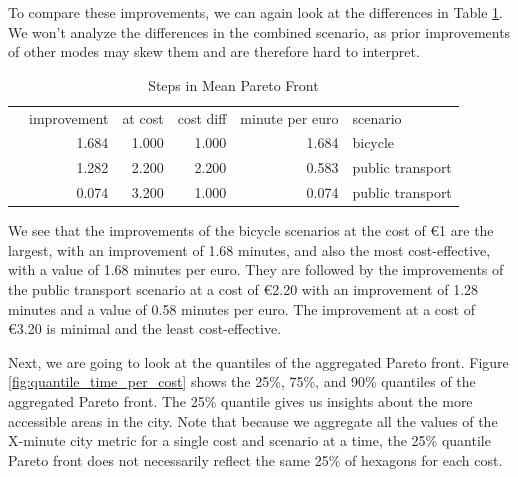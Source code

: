 To compare these improvements, we can again look at the differences in Table \ref{tab:differences_in_mean_pareto_front}.
We won't analyze the differences in the combined scenario, as prior improvements of other modes may skew them and are therefore hard to interpret.

\begin{table}
  \caption{Steps in Mean Pareto Front}
  \label{tab:differences_in_mean_pareto_front}
  \begin{center}
    \begin{tabular}{lrrrrl}
     & improvement & at cost & cost diff & minute per euro & scenario \\
     & 1.684 & 1.000 & 1.000 & 1.684 & bicycle \\
     & 1.282 & 2.200 & 2.200 & 0.583 & public transport \\
     & 0.074 & 3.200 & 1.000 & 0.074 & public transport \\
    \end{tabular}
  \end{center}
\end{table}

We see that the improvements of the bicycle scenarios at the cost of \euro{1} are the largest, with an improvement of 1.68 minutes, and also the most cost-effective, with a value of 1.68 minutes per euro.
They are followed by the improvements of the public transport scenario at a cost of \euro{2.20} with an improvement of 1.28 minutes and a value of 0.58 minutes per euro.
The improvement at a cost of \euro{3.20} is minimal and the least cost-effective.

Next, we are going to look at the quantiles of the aggregated Pareto front.
Figure \ref{fig:quantile_time_per_cost} shows the 25\%, 75\%, and 90\% quantiles of the aggregated Pareto front.
The 25\% quantile gives us insights about the more accessible areas in the city.
Note that because we aggregate all the values of the X-minute city metric for a single cost and scenario at a time, the 25\% quantile Pareto front does not necessarily reflect the same 25\% of hexagons for each cost.

